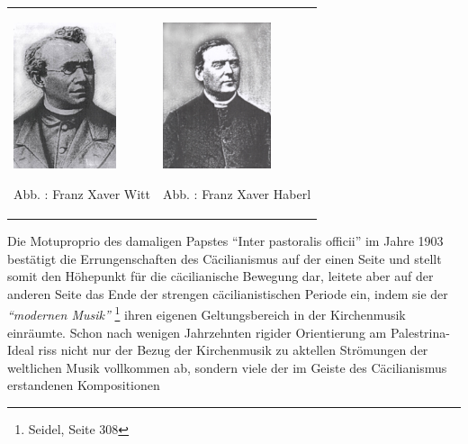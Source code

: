 \documentclass[a4paper]{article}
\newcommand\textstyleZitate[1]{\textit{#1}}
\newcounter{Abb}
\renewcommand\theAbb{\arabic{Abb}}
\begin{document}
\begin{center}
\begin{minipage}{6.943cm}
\begin{flushleft}
\tablefirsthead{}
\tablehead{}
\tabletail{}
\tablelasttail{}
\begin{supertabular}{m{3.197cm}m{3.345cm}}

\includegraphics[width=3.016cm,height=4.284cm]{pictures/zulassungsarbeit-img078.jpg}

Abb. \stepcounter{Abb}{\theAbb}: Franz Xaver Witt &

\includegraphics[width=3.163cm,height=4.3cm]{pictures/zulassungsarbeit-img079.jpg}

Abb. \stepcounter{Abb}{\theAbb}: Franz Xaver Haberl\\
\end{supertabular}
\end{flushleft}
\end{minipage}
\end{center}
Die Motuproprio des damaligen Papstes “Inter pastoralis officii” im
Jahre 1903 bestätigt die Errungenschaften des Cäcilianismus auf der
einen Seite und stellt somit den Höhepunkt für die cäcilianische
Bewegung dar, leitete aber auf der anderen Seite das Ende der strengen
cäcilianistischen Periode ein, indem sie der \textstyleZitate{“modernen
Musik” } \footnote{Seidel, Seite 308} ihren eigenen Geltungsbereich in
der Kirchenmusik einräumte. Schon nach wenigen Jahrzehnten rigider
Orientierung am Palestrina-Ideal riss nicht nur der Bezug der
Kirchenmusik zu aktellen Strömungen der weltlichen Musik vollkommen ab,
sondern viele der im Geiste des Cäcilianismus erstandenen Kompositionen
\end{document}
